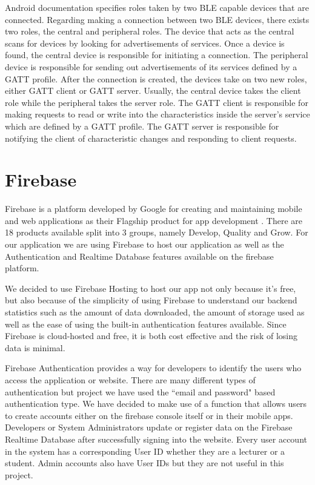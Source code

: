 \documentclass[../report.tex]{subfiles}
\begin{document}
Android documentation specifies roles taken by two BLE capable devices that are connected. Regarding making a connection between two BLE devices, there exists two roles, the central and peripheral roles. The device that acts as the central scans for devices by looking for advertisements of services. Once a device is found, the central device is responsible for initiating a connection. The peripheral device is responsible for sending out advertisements of its services defined by a GATT profile. After the connection is created, the devices take on two new roles, either GATT client or GATT server. Usually, the central device takes the client role while the peripheral takes the server role. The GATT client is responsible for making requests to read or write into the characteristics inside the server’s service which are defined by a GATT profile. The GATT server is responsible for notifying the client of characteristic changes and responding to client requests.

\section{Firebase}
Firebase is a platform developed by Google for creating and maintaining mobile and web applications as their Flagship product for app development \cite{firebase-crunchbase}. There are 18 products available split into 3 groups, namely Develop, Quality and Grow. For our application we are using Firebase to host our application as well as the Authentication and Realtime Database features available on the firebase platform. 

We decided to use Firebase Hosting to host our app not only because it’s free, but also because of the simplicity of using Firebase to understand our backend statistics such as the amount of data downloaded, the amount of storage used as well as the ease of using the built-in authentication features available. Since Firebase is cloud-hosted and free, it is both cost effective and the risk of losing data is minimal.

Firebase Authentication provides a way for developers to identify the users who access the application or website. There are many different types of authentication but project we have used the ``email and password" based authentication type. We have decided to make use of a function that allows users to create accounts either on the firebase console itself or in their mobile apps. Developers or System Administrators update or register data on the Firebase Realtime Database after successfully signing into the website. Every user account in the system has a corresponding User ID whether they are a lecturer or a student. Admin accounts also have User IDs but they are not useful in this project.
\end{document}

